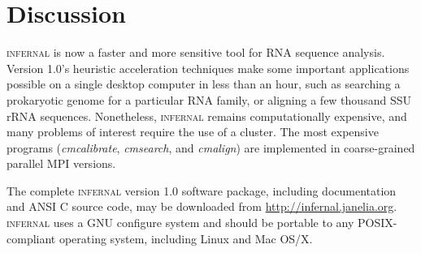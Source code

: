 \section{Discussion}

\textsc{infernal} is now a faster and more sensitive tool for RNA
sequence analysis.  Version 1.0's heuristic acceleration techniques
make some important applications possible on a single desktop computer
in less than an hour, such as searching a prokaryotic genome for a
particular RNA family, or aligning a few thousand SSU rRNA sequences.
Nonetheless, \textsc{infernal} remains computationally expensive, and many
problems of interest require the use of a cluster.  The most expensive
programs (\emph{cmcalibrate}, \emph{cmsearch}, and \emph{cmalign}) are
implemented in coarse-grained parallel MPI versions.







The complete \textsc{infernal} version 1.0 software package, including
documentation and ANSI C source code, may be downloaded from
\url{http://infernal.janelia.org}. \textsc{infernal} uses a GNU
configure system and should be portable to any POSIX-compliant
operating system, including Linux and Mac OS/X.

